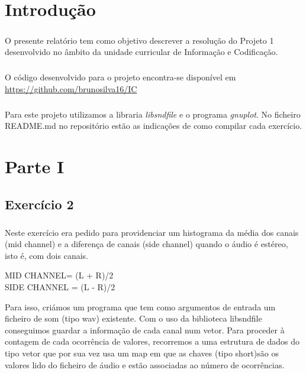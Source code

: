\documentclass{report}
\begin{document}
\clearpage
{}

\chapter{Introdução}
\label{chap.introducao}
\paragraph{}
O presente relatório tem como objetivo descrever a resolução do Projeto 1 desenvolvido no âmbito da unidade curricular de Informação e Codificação.

\paragraph{}
O código desenvolvido para o projeto encontra-se disponível em \url{https://github.com/brunosilva16/IC}

\paragraph{}
Para este projeto utilizamos a libraria \textit{libsndfile} e o programa \textit{gnuplot}. 
No ficheiro README.md no repositório estão as indicações de como compilar cada exercício.


\chapter{Parte I}
\label{chap.ParteI}
\section{Exercício 2}
\paragraph{}
Neste exercício era pedido para providenciar um histograma da média dos canais (mid channel) e a diferença de canais (side channel) quando o áudio é estéreo, isto é, com dois canais.
\begin{center}
    MID CHANNEL= (L + R)/2\\
    SIDE CHANNEL = (L - R)/2
\end{center}

Para isso, criámos um programa que tem como argumentos de entrada um ficheiro de som (tipo wav) existente.
Com o uso da biblioteca libsndfile conseguimos guardar a informação de cada canal num vetor.
Para proceder à contagem de cada ocorrência de valores, recorremos a uma estrutura de dados do tipo vetor que por sua vez usa um map em que as chaves (tipo short)são os valores lido do ficheiro de áudio e estão associadas ao número de ocorrências.
\end{document}
